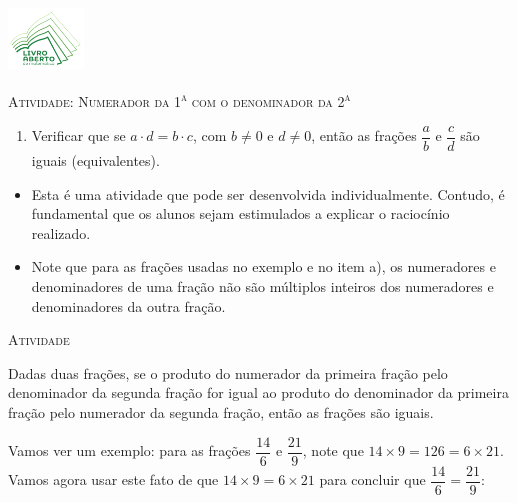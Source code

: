 \documentclass[10 pt,usenames,dvipsnames, oneside]{article}
\begin{document}
\begin{center}
  \begin{minipage}[l]{3cm}
\includegraphics[width=2cm]{../../../Figuras/logo}       
\end{minipage}\hfill
\begin{minipage}[r]{.8\textwidth}
 {\Large \scshape Atividade: Numerador da 1\textsuperscript{a} com o denominador da 2\textsuperscript{a}}  
\end{minipage}
\end{center}
\vspace{.2cm}

\ifdefined\prof
\begin{goals}
\begin{enumerate}
    \item       Verificar que se       $a \cdot d = b \cdot c$, com       $b
\not = 0$       e       $d \not = 0$, então as frações       $\dfrac{a}{b}$
e       $\dfrac{c}{d}$       são iguais (equivalentes).
\end{enumerate}

\tcblower

\begin{itemize}
    \item       Esta é uma atividade que pode ser desenvolvida individualmente.
Contudo, é fundamental que os alunos sejam estimulados a explicar o raciocínio
realizado.
    \item       Note que para as frações usadas no exemplo e no item a), os
numeradores e denominadores de uma fração não são múltiplos inteiros dos
numeradores e denominadores da outra fração.
\end{itemize}
\end{goals}

\bigskip
\begin{center}
{\large \scshape Atividade}
\end{center}
\fi

Dadas duas frações, se o produto do numerador da primeira fração pelo denominador da segunda fração for igual ao produto do denominador da primeira fração pelo numerador da segunda fração, então as frações são iguais.

Vamos ver um exemplo: para as frações $\dfrac{14}{6}$ e $\dfrac{21}{9}$, note que  $14 \times 9 = 126 = 6 \times 21$. Vamos agora usar este fato de que $14 \times 9 = 6 \times 21$
para concluir que $\dfrac{14}{6} = \dfrac{21}{9}$:
\end{document}
